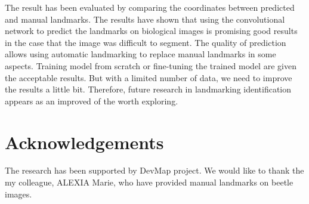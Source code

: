 \documentclass[10pt]{article}
\begin{document}
The result has been evaluated by comparing the coordinates between predicted and manual landmarks.  The results have shown that using the convolutional network to predict the landmarks on biological images is promising good results in the case that the image was difficult to segment. The quality of prediction allows using automatic landmarking to replace manual landmarks in some aspects. Training model from scratch or fine-tuning the trained model are given the acceptable results. But with a limited number of data, we need to improve the results a little bit. Therefore, future research in landmarking identification appears as an improved of the worth exploring.

\section*{Acknowledgements}
The research has been supported by DevMap project. We would like to thank the my colleague, ALEXIA Marie, who have provided manual landmarks on beetle images.


\end{document}
